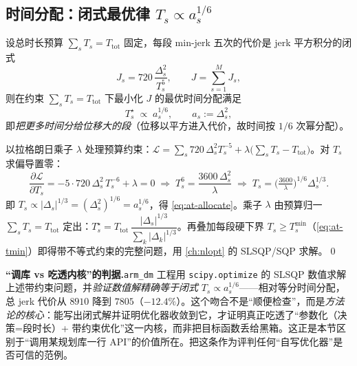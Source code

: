 \subsection{时间分配：闭式最优律 \texorpdfstring{$T_s\propto a_s^{1/6}$}{Ts proportional to as^(1/6)}}
\label{subsec:at-allocate}

\begin{theorem}\label{thm:at-allocate}
设总时长预算 $\sum_s T_s=T_{\mathrm{tot}}$ 固定，每段 min-jerk 五次的代价是 jerk 平方积分的闭式
\begin{equation}
  J_s=720\,\frac{\Delta_s^2}{T_s^{5}},\qquad J=\sum_{s=1}^{M}J_s,
  \label{eq:at-jcost}
\end{equation}
则在约束 $\sum_s T_s=T_{\mathrm{tot}}$ 下最小化 $J$ 的最优时间分配满足
\begin{equation}
  T_s^\star \;\propto\; a_s^{1/6},\qquad a_s:=\Delta_s^2,
  \label{eq:at-allocate}
\end{equation}
即\emph{把更多时间分给位移大的段}（位移以平方进入代价，故时间按 $1/6$ 次幂分配）。
\end{theorem}

\begin{derivation}[闭式时间分配的拉格朗日推导]\label{der:at-allocate}
以拉格朗日乘子 $\lambda$ 处理预算约束：$\mathcal{L}=\sum_s 720\,\Delta_s^2 T_s^{-5}+\lambda\big(\sum_s T_s-T_{\mathrm{tot}}\big)$。对 $T_s$ 求偏导置零：
\begin{equation}
  \frac{\partial\mathcal{L}}{\partial T_s}=-5\cdot 720\,\Delta_s^2\,T_s^{-6}+\lambda=0
  \;\Longrightarrow\;
  T_s^{6}=\frac{3600\,\Delta_s^2}{\lambda}
  \;\Longrightarrow\;
  T_s=\Big(\tfrac{3600}{\lambda}\Big)^{1/6}\Delta_s^{1/3}.
  \label{eq:at-allocate-kkt}
\end{equation}
即 $T_s\propto |\Delta_s|^{1/3}=(\Delta_s^2)^{1/6}=a_s^{1/6}$，得 \cref{eq:at-allocate}。乘子 $\lambda$ 由预算归一 $\sum_s T_s=T_{\mathrm{tot}}$ 定出：$T_s^\star=T_{\mathrm{tot}}\,\dfrac{|\Delta_s|^{1/3}}{\sum_k|\Delta_k|^{1/3}}$。再叠加每段硬下界 $T_s\ge T_s^{\min}$（\cref{eq:at-tmin}）即得带不等式约束的完整问题，用 \cref{ch:nlopt} 的 SLSQP/SQP 求解。\qed
\end{derivation}

\begin{insight}
\textbf{“调库 vs 吃透内核”的判据.}\;\texttt{arm\_dm} 工程用 \texttt{scipy.\allowbreak optimize} 的 SLSQP 数值求解上述带约束问题，并\emph{验证数值解精确等于闭式} $T_s\propto a_s^{1/6}$——相对等分时间分配，总 jerk 代价从 $8910$ 降到 $7805$（$-12.4\%$）。这个吻合不是“顺便检查”，而是\emph{方法论的核心}：能写出闭式解并证明优化器收敛到它，才证明真正吃透了“参数化（决策=段时长）+ 带约束优化”这一内核，而非把目标函数丢给黑箱。这正是本节区别于“调用某规划库一行 API”的价值所在。把这条作为评判任何“自写优化器”是否可信的范例。
\end{insight}

